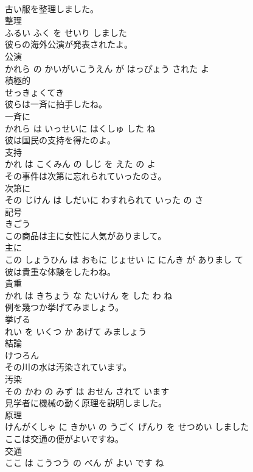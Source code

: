 \documentclass[8pt]{extreport}
\begin{document}
\begin{CJK}{UTF8}{min}
\\	古い服を整理しました。	
\\	整理 
\\	ふるい ふく を せいり しました		
\\	彼らの海外公演が発表されたよ。	
\\	公演 
\\	かれら の かいがいこうえん が はっぴょう された よ		
\\	積極的	
\\	せっきょくてき		
\\	彼らは一斉に拍手したね。	
\\	一斉に 
\\	かれら は いっせいに はくしゅ した ね		
\\	彼は国民の支持を得たのよ。	
\\	支持 
\\	かれ は こくみん の しじ を えた の よ		
\\	その事件は次第に忘れられていったのさ。	
\\	次第に 
\\	その じけん は しだいに わすれられて いった の さ		
\\	記号	
\\	きごう		
\\	この商品は主に女性に人気がありまして。	
\\	主に 
\\	この しょうひん は おもに じょせい に にんき が ありまし て		
\\	彼は貴重な体験をしたわね。	
\\	貴重 
\\	かれ は きちょう な たいけん を した わ ね		
\\	例を幾つか挙げてみましょう。	
\\	挙げる 
\\	れい を いくつ か あげて みましょう		
\\	結論	
\\	けつろん		
\\	その川の水は汚染されています。	
\\	汚染 
\\	その かわ の みず は おせん されて います		
\\	見学者に機械の動く原理を説明しました。	
\\	原理 
\\	けんがくしゃ に きかい の うごく げんり を せつめい しました		
\\	ここは交通の便がよいですね。	
\\	交通 
\\	ここ は こうつう の べん が よい です ね		

\end{CJK}
\end{document}
